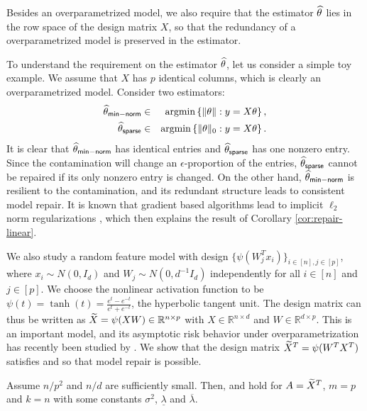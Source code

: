 Besides an overparametrized model, we also require that the estimator $\widehat{\theta}$ lies in the row space of the design matrix $X$, so that the redundancy of a overparametrized model is preserved in the estimator.
\begin{remark}
To understand the requirement on the estimator $\widehat{\theta}$, let us consider a simple toy example. We assume that $X$ has $p$ identical columns, which is clearly an overparametrized model. Consider two estimators:
\begin{eqnarray*}
\wh{\theta}_{\sf min-norm} &\in& \argmin\left\{\|\theta\|: y=X\theta\right\}, \\
\wh{\theta}_{\sf sparse} &\in& \argmin\left\{\|\theta\|_0: y=X\theta\right\}.
\end{eqnarray*}
It is clear that $\widehat{\theta}_{\sf min-norm}$ has identical entries and $\widehat{\theta}_{\sf sparse}$ has one nonzero entry. Since the contamination will change an $\epsilon$-proportion of the entries, $\widehat{\theta}_{\sf sparse}$ cannot be repaired if its only nonzero entry is changed. On the other hand, $\widehat{\theta}_{\sf min-norm}$ is resilient to the contamination, and its redundant structure leads to consistent model repair. It is known that gradient based algorithms lead to implicit $\ell_2$ norm regularizations \citep{neyshabur2014search}, which then explains the result of Corollary \ref{cor:repair-linear}.
\end{remark}


We also study a random feature model with design $\{\psi(W_j^Tx_i)\}_{i\in[n],j\in[p]}$, where $x_i\sim N(0,I_d)$ and $W_j\sim N(0,d^{-1}I_d)$ independently for all $i\in[n]$ and $j\in[p]$. We choose the nonlinear activation function to be $\psi(t)=\tanh(t)=\frac{e^t-e^{-t}}{e^t+e^{-t}}$, the hyperbolic tangent unit. The design matrix can thus be written as $\widetilde{X}=\psi(XW)\in\mathbb{R}^{n\times p}$ with $X\in\mathbb{R}^{n\times d}$ and $W\in\mathbb{R}^{d\times p}$. This is an important model, and its asymptotic risk behavior under overparametrization has recently been studied by \cite{mei2019generalization}. We show that the design matrix $\widetilde{X}^T=\psi(W^TX^T)$ satisfies \conditionA{} and \conditionB{} so that model repair is possible.

\begin{lemma}\label{lem:design-rf}
Assume $n/p^2$ and $n/d$ are sufficiently small. Then, \conditionA{} and \conditionB{} hold for $A=\widetilde{X}^T$, $m=p$ and $k=n$ with some constants  $\sigma^2$, $\underline{\lambda}$ and $\overline{\lambda}$.
\end{lemma}


